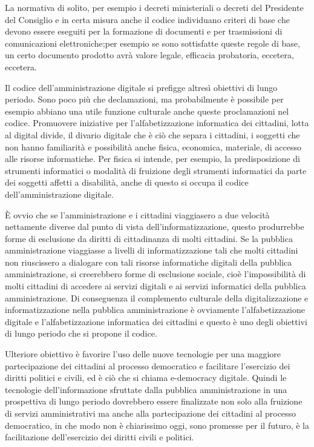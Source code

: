 La normativa di solito, per esempio i decreti ministeriali o decreti del Presidente del Consiglio e in certa misura anche il codice individuano criteri di base che devono essere eseguiti per la formazione di documenti e per trasmissioni di comunicazioni elettroniche;per esempio se sono sottisfatte queste regole di base, un certo documento prodotto avrà valore legale, efficacia probatoria, eccetera, eccetera. 

Il codice dell'amministrazione digitale si prefigge altresì obiettivi di lungo periodo. Sono poco più che declamazioni, ma probabilmente  è possibile per esempio abbiano una utile funzione culturale anche queste proclamazioni nel codice. 
Promuovere iniziative per l'alfabetizzazione informatica dei cittadini, lotta al digital divide, il divario digitale che è ciò che separa i cittadini, i soggetti che non hanno familiarità e possibilità anche fisica, economica, materiale, di accesso alle risorse informatiche. 
Per fisica si intende, per esempio, la predisposizione di strumenti informatici o modalità di fruizione degli strumenti informatici da parte dei soggetti affetti a disabilità, anche di questo si occupa il codice dell'amministrazione digitale. 

È ovvio che se l'amministrazione e i cittadini viaggiasero a due velocità nettamente diverse dal punto di vista dell'informatizzazione, questo produrrebbe forme di esclusione da diritti di cittadinanza di molti cittadini. Se la pubblica amministrazione viaggiasse a livelli di informatizzazione tali che molti cittadini non riuscissero a dialogare con tali risorse informatiche digitali della pubblica amministrazione, si creerebbero forme di esclusione sociale, cioè l'impossibilità di molti cittadini di accedere ai servizi digitali e ai servizi informatici della pubblica amministrazione. Di conseguenza il complemento culturale della digitalizzazione e informatizzazione nella pubblica amministrazione è ovviamente l'alfabetizzazione digitale e l'alfabetizzazione informatica dei cittadini e questo è uno degli obiettivi di lungo periodo che si propone il codice. 

Ulteriore obiettivo è favorire l'uso delle nuove tecnologie per una maggiore partecipazione dei cittadini al processo democratico e facilitare l'esercizio dei diritti politici e civili, ed è ciò che si chiama e-democracy digitale.
Quindi le tecnologie dell'informazione sfruttate dalla pubblica amministrazione in una prospettiva di lungo periodo dovrebbero essere finalizzate non solo alla fruizione di servizi amministrativi ma anche alla partecipazione dei cittadini al processo democratico, in che modo non è chiarissimo oggi, sono promesse per il futuro, è la facilitazione dell'esercizio dei diritti civili e politici. 

